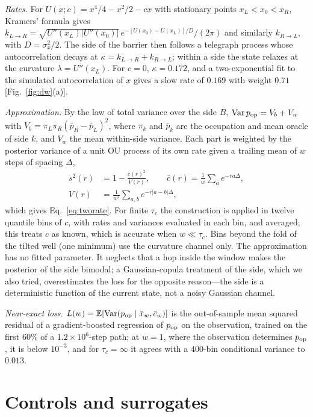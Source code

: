 \emph{Rates.} For $U(x;c)=x^4/4-x^2/2-cx$ with stationary points $x_L<x_0<x_R$, Kramers' formula \cite{kramers1940,hanggi1990} gives $k_{L\to R}=\sqrt{U''(x_L)|U''(x_0)|}\,e^{-[U(x_0)-U(x_L)]/D}/(2\pi)$ and similarly $k_{R\to L}$, with $D=\sigma_x^2/2$. The side of the barrier then follows a telegraph process whose autocorrelation decays at $\kappa=k_{L\to R}+k_{R\to L}$; within a side the state relaxes at the curvature $\lambda=U''(x_L)$. For $c=0$, $\kappa=0.172$, and a two-exponential fit to the simulated autocorrelation of $x$ gives a slow rate of $0.169$ with weight $0.71$ [Fig.~\ref{fig:dw}(a)].

\emph{Approximation.} By the law of total variance over the side $B$, $\mathrm{Var}\,p_{\mathrm{op}}=V_b+V_w$ with $V_b=\pi_L\pi_R(\bar p_R-\bar p_L)^2$, where $\pi_k$ and $\bar p_k$ are the occupation and mean oracle of side $k$, and $V_w$ the mean within-side variance. Each part is weighted by the posterior variance of a unit OU process of its own rate given a trailing mean of $w$ steps of spacing $\Delta$,
\begin{align}
s^2(r)&=1-\frac{\bar c(r)^2}{V(r)},\qquad \bar c(r)=\frac{1}{w}\sum_{a}e^{-ra\Delta},\nonumber\\
V(r)&=\frac{1}{w^2}\sum_{a,b}e^{-r|a-b|\Delta},
\end{align}
which gives Eq.~\eqref{eq:tworate}. For finite $\tau_c$ the construction is applied in twelve quantile bins of $c$, with rates and variances evaluated in each bin, and averaged; this treats $c$ as known, which is accurate when $w\ll\tau_c$. Bins beyond the fold of the tilted well (one minimum) use the curvature channel only. The approximation has no fitted parameter. It neglects that a hop inside the window makes the posterior of the side bimodal; a Gaussian-copula treatment of the side, which we also tried, overestimates the loss for the opposite reason---the side is a deterministic function of the current state, not a noisy Gaussian channel.

\emph{Near-exact loss.} $L(w)=\mathbb{E}[\mathrm{Var}(p_{\mathrm{op}}\mid\bar x_w,\bar c_w)]$ is the out-of-sample mean squared residual of a gradient-boosted regression of $p_{\mathrm{op}}$ on the observation, trained on the first 60\% of a $1.2\times10^6$-step path; at $w=1$, where the observation determines $p_{\mathrm{op}}$, it is below $10^{-3}$, and for $\tau_c=\infty$ it agrees with a 400-bin conditional variance to $0.013$.

\section{Controls and surrogates}\label{app:surrogates}

